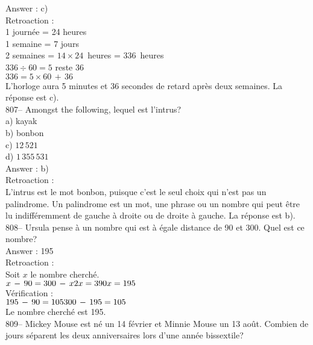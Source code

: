 ﻿\documentclass[letterpaper, 12pt]{article}
\begin{document}
Answer : c)\\

Retroaction : \\
1 journ\'ee = 24 heures\\
1 semaine = 7 jours\\
2 semaines = $14\times24$~heures = 336~heures\\
$336\div60=5$ reste 36\\
$336=5\times60\,+\,36$\\
L'horloge aura 5 minutes et 36 secondes de retard apr\`es deux semaines.  La
r\'eponse est c).\\

807-- Amongst the following, lequel est l'intrus?\\
a) kayak\\
b) bonbon\\
c) $12\,521$\\
d) $1\,355\,531$\\

Answer : b)\\

Retroaction : \\
L'intrus est le mot bonbon, puisque c'est le seul choix qui n'est pas un
palindrome.  Un palindrome est un mot, une phrase ou un nombre qui peut
\^etre lu indiff\'eremment de gauche \`a droite ou de droite \`a gauche.  La
r\'eponse est b).\\

808-- Ursula pense \`a un nombre qui est \`a \'egale distance de 90 et 300.
Quel est ce nombre?\\

Answer : 195\\

Retroaction : \\
Soit $x$ le nombre cherch\'e.\\

$x\,-\,90=300\,-\,x\\
2x=390\\
x=195$\\

V\'erification : \\
$195\,-\,90=105\\
300\,-\,195=105$\\

Le nombre cherch\'e est 195.\\

809-- Mickey Mouse est n\'e un 14 f\'evrier et Minnie Mouse un 13 ao\^ut.
Combien de jours s\'eparent les deux anniversaires lors d'une ann\'ee
bissextile?\\
\end{document}
